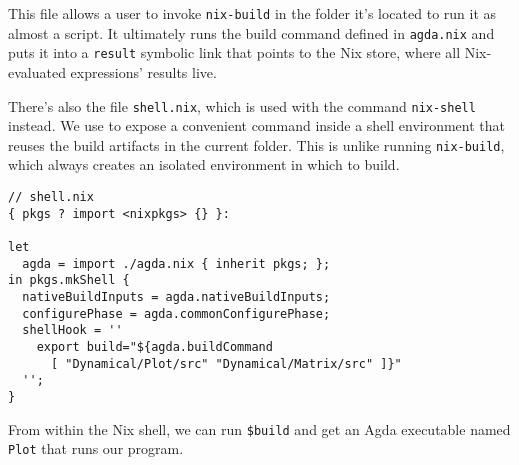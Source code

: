 This file allows a user to invoke \texttt{nix-build} in the folder it's located to run it as almost a script. It ultimately runs the build command defined in \texttt{agda.nix} and puts it into a \texttt{result} symbolic link that points to the Nix store, where all Nix-evaluated expressions' results live.

There's also the file \texttt{shell.nix}, which is used with the command \texttt{nix-shell} instead. We use to expose a convenient command inside a shell environment that reuses the build artifacts in the current folder. This is unlike running \texttt{nix-build}, which always creates an isolated environment in which to build.

\begin{verbatim}
// shell.nix
{ pkgs ? import <nixpkgs> {} }:

let
  agda = import ./agda.nix { inherit pkgs; };
in pkgs.mkShell {
  nativeBuildInputs = agda.nativeBuildInputs;
  configurePhase = agda.commonConfigurePhase;
  shellHook = ''
    export build="${agda.buildCommand 
      [ "Dynamical/Plot/src" "Dynamical/Matrix/src" ]}"
  '';
}
\end{verbatim}

From within the Nix shell, we can run \texttt{\$build} and get an Agda executable named \texttt{Plot} that runs our program.
